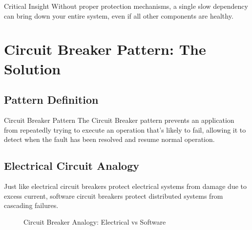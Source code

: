\documentclass[12pt,a4paper]{article}
\begin{document}
\begin{warningbox}{Critical Insight}
Without proper protection mechanisms, a single slow dependency can bring down your entire system, even if all other components are healthy.
\end{warningbox}

\section{Circuit Breaker Pattern: The Solution}

\subsection{Pattern Definition}

\begin{definitionbox}{Circuit Breaker Pattern}
The Circuit Breaker pattern prevents an application from repeatedly trying to execute an operation that's likely to fail, allowing it to detect when the fault has been resolved and resume normal operation.
\end{definitionbox}

\subsection{Electrical Circuit Analogy}

Just like electrical circuit breakers protect electrical systems from damage due to excess current, software circuit breakers protect distributed systems from cascading failures.

\begin{figure}[H]
\centering
{}
\caption{Circuit Breaker Analogy: Electrical vs Software}
\end{figure}
\end{document}

